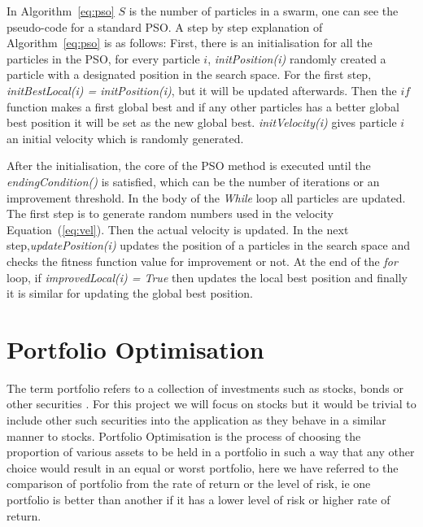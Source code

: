 \documentclass{pdfmx4020}
\begin{document}
  In Algorithm~\ref{eq:pso} $S$ is the number of particles in a swarm, one can see the pseudo-code for a standard PSO. A step by step explanation of Algorithm~\ref{eq:pso} is as follows: First, there is an initialisation for all the particles in the PSO, for every particle $i$, \textit{initPosition(i)} randomly created a particle with a designated position in the search space. For the first step, \textit{initBestLocal(i) = initPosition(i)}, but it will be updated afterwards. Then the $if$ function makes a first global best and if any other particles has a better global best position it will be set as the new global best. \textit{initVelocity(i)} gives particle $i$ an initial velocity which is randomly generated. 

  After the initialisation, the core of the PSO method is executed until the \textit{endingCondition()} is satisfied, which can be the number of iterations or an improvement threshold. In the body of the \textit{While} loop all particles are updated. The first step is to generate random numbers used in the velocity Equation~(\ref{eq:vel}). Then the actual velocity is updated. In the next step,\textit{updatePosition(i)} updates the position of a particles in the search space and checks the fitness function value for improvement or not. At the end of the \textit{for} loop, if \textit{improvedLocal(i) = True} then updates the local best position and finally it is similar for updating the global best position. 

  \section{Portfolio Optimisation} %
  \label{sec:portfolio_management}
  The term portfolio refers to a collection of investments such as stocks, bonds or other securities \cite{portfolio}. For this project we will focus on stocks but it would be trivial to include other such securities into the application as they behave in a similar manner to stocks. Portfolio Optimisation is the process of choosing the proportion of various assets to be held in a portfolio in such a way that any other choice would result in an equal or worst portfolio, here we have referred to the comparison of portfolio from the rate of return or the level of risk, ie one portfolio is better than another if it has a lower level of risk or higher rate of return. 
\end{document}
